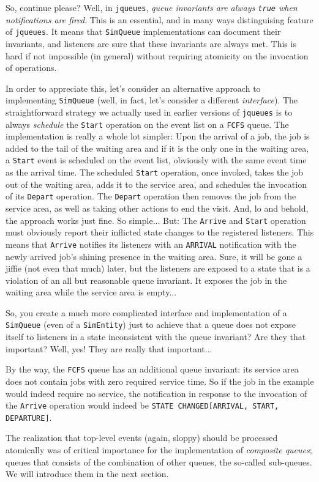 So, continue please?
Well, in \lstinline|jqueues|,
  {\em queue invariants are always \lstinline|true| when notifications are fired}.
This is an essential, and in many ways distinguising feature of \lstinline|jqueues|.
It means that \lstinline|SimQueue| implementations can document
  their invariants,
  and listeners are sure that these invariants are always met.
This is hard if not impossible (in general) without requiring atomicity on
  the invocation of operations.

In order to appreciate this,
  let's consider an alternative approach to implementing \lstinline|SimQueue|
  (well, in fact, let's consider a different {\em interface\/}).
The straightforward strategy we actually used in earlier versions
  of \lstinline|jqueues| is to always {\em schedule\/}
  the \lstinline|Start| operation on the event list
  on a \lstinline|FCFS| queue.
The implementation is really a whole lot simpler:
  Upon the arrival of a job,
  the job is added to the tail of the waiting area
  and if it is the only one in the waiting area,
  a \lstinline|Start| event is scheduled on the event list,
  obviously with the same event time as the arrival time.
The scheduled \lstinline|Start| operation,
  once invoked,
  takes the job out of the waiting area,
  adds it to the service area,
  and schedules the invocation of
  its \lstinline|Depart| operation.
The \lstinline|Depart| operation then
  removes the job from the service area,
  as well as taking other actions to
  end the visit.
And, lo and behold,
  the approach works just fine.
So simple...
But: The \lstinline|Arrive| and \lstinline|Start|
  operation must obviously report
  their inflicted state changes to the registered listeners.
This means that
  \lstinline|Arrive| notifies its listeners with an \lstinline|ARRIVAL|
  notification with the newly arrived job's
  shining presence in the waiting area.
Sure,
  it will be gone a jiffie (not even that much) later,
  but the listeners are exposed to a state
  that is a violation of an all but reasonable
  queue invariant.
It exposes the job in the waiting area while
  the service area is empty...

So, you create a much more complicated interface and
  implementation of a \lstinline|SimQueue|
  (even of a \lstinline|SimEntity|)
  just to achieve that
  a queue does not expose itself to listeners
  in a state inconsistent with the queue invariant?
Are they that important?
Well, yes! They are really that important...

By the way,
  the \lstinline|FCFS| queue has an additional queue invariant:
  its service area does not contain jobs with zero
  required service time.
So if the job in the example would indeed require no
  service, the notification in response to
  the invocation of the \lstinline|Arrive| operation
  would indeed be \lstinline|STATE CHANGED[ARRIVAL, START, DEPARTURE]|.

The realization that top-level events (again, sloppy) should
  be processed atomically was of critical importance
  for the implementation of {\em composite queues\/};
  queues that consists of the combination of other
  queues, the so-called sub-queues.
We will introduce them in the next section.

